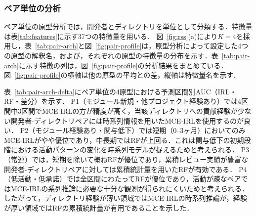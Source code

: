 \documentclass[submit,noauthor,ses,dvipdfmx]{ipsj}
\begin{document}
\subsubsection{ペア単位の分析}\label{sec:pair-arch}

ペア単位の原型分析では，開発者とディレクトリを単位として分類する．特徴量は表\ref{tab:features}に示す37つの特徴量を用いる．
図~\ref{fig:rss}(a)により$K = 4$を採用し，表~\ref{tab:pair-arch}と図~\ref{fig:pair-profile}は，原型分析によって設定した4つの原型の解釈名，および，それぞれの原型の特徴量の分布を示す．表~\ref{tab:pair-arch}に示す特徴の列は，図~\ref{fig:pair-profile}の分析結果をまとめている．図~\ref{fig:pair-profile}の横軸は他の原型の平均との差，縦軸は特徴量名を示す．

表~\ref{tab:pair-arch-delta}にペア単位の4原型における予測区間別AUC（IRL・RF・差分）を示す．
P1（モジュール新規・他プロジェクト経験あり）では4区間中3区間でMCE-IRLの方が精度が高く，当該ディレクトリへの貢献経験が少ない開発者-ディレクトリペアには時系列情報を用いたMCE-IRLを使用するのが良い．
P2（モジュール経験あり・関与低下）では短期（0--3ヶ月）においてのみMCE-IRLがやや優位であり，中長期ではRFが上回る．これは関与低下の初期段階における活動パターンの変化を時系列モデルが捉えるためと考えられる．
P3（常連）では，短期を除いて概ねRFが優位であり，累積レビュー実績が豊富な開発者-ディレクトリペアに対しては累積統計量を用いたRFが有効である．
P4（低活動・低承諾）では全区間にわたってRFが優位であり，活動が疎なペアではMCE-IRLの系列推論に必要な十分な観測が得られにくいためと考えられる．
したがって，ディレクトリ経験が薄い領域ではMCE-IRLの時系列推論が，経験が厚い領域ではRFの累積統計量が有用であることを示した．


\end{document}
